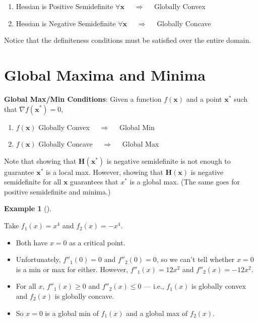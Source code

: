 \documentclass[
  letterpaper,
]{book}
\providecommand{\tightlist}{%
  \setlength{\itemsep}{0pt}\setlength{\parskip}{0pt}}\usepackage{longtable,booktabs,array}
\theoremstyle{definition}
\theoremstyle{definition}
\newtheorem{example}{Example}[chapter]
\theoremstyle{plain}
\theoremstyle{definition}
\theoremstyle{plain}
\theoremstyle{plain}
\theoremstyle{remark}
\begin{document}
\begin{enumerate}
\def\labelenumi{\arabic{enumi}.}
\tightlist
\item
  Hessian is Positive Semidefinite \(\forall \mathbf{x}\)
  \(\quad \Longrightarrow \quad\) Globally Convex
\item
  Hessian is Negative Semidefinite \(\forall \mathbf{x}\)
  \(\quad \Longrightarrow \quad\) Globally Concave
\end{enumerate}

Notice that the definiteness conditions must be satisfied over the
entire domain.

\hypertarget{global-maxima-and-minima}{%
\section{Global Maxima and Minima}\label{global-maxima-and-minima}}

\textbf{Global Max/Min Conditions}: Given a function \(f(\mathbf{x})\)
and a point \(\mathbf{x}^*\) such that \(\nabla f(\mathbf{x}^*)=0\),

\begin{enumerate}
\def\labelenumi{\arabic{enumi}.}
\tightlist
\item
  \(f(\mathbf{x})\) Globally Convex \(\quad \Longrightarrow \quad\)
  Global Min
\item
  \(f(\mathbf{x})\) Globally Concave \(\quad \Longrightarrow \quad\)
  Global Max
\end{enumerate}

Note that showing that \(\mathbf{H(x^*)}\) is negative semidefinite is
not enough to guarantee \(\mathbf{x}^*\) is a local max. However,
showing that \(\mathbf{H(x)}\) is negative semidefinite for all
\(\mathbf{x}\) guarantees that \(x^*\) is a global max. (The same goes
for positive semidefinite and minima.)

\leavevmode{}%
\begin{example}[]\label{exm-}

Take \(f_1(x)=x^4\) and \(f_2(x)=-x^4\).

\begin{itemize}
\tightlist
\item
  Both have \(x=0\) as a critical point.\\
\item
  Unfortunately, \(f''_1(0)=0\) and \(f''_2(0)=0\), so we can't tell
  whether \(x=0\) is a min or max for either. However,
  \(f''_1(x)=12x^2\) and \(f''_2(x)=-12x^2\).\\
\item
  For all \(x\), \(f''_1(x)\ge 0\) and \(f''_2(x)\le 0\) --- i.e.,
  \(f_1(x)\) is globally convex and \(f_2(x)\) is globally concave.
\item
  So \(x=0\) is a global min of \(f_1(x)\) and a global max of
  \(f_2(x)\).
\end{itemize}

\end{example}
\end{document}
